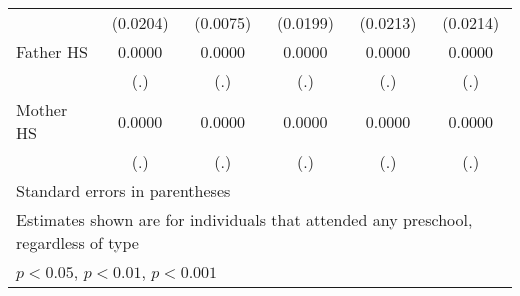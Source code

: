 \begin{table}[htbp]
\begin{tabular}{l*{5}{c}}
            &    (0.0204)         &    (0.0075)         &    (0.0199)         &    (0.0213)         &    (0.0214)         \\
\addlinespace
Father HS   &      0.0000         &      0.0000         &      0.0000         &      0.0000         &      0.0000         \\
            &         (.)         &         (.)         &         (.)         &         (.)         &         (.)         \\
\addlinespace
Mother HS   &      0.0000         &      0.0000         &      0.0000         &      0.0000         &      0.0000         \\
            &         (.)         &         (.)         &         (.)         &         (.)         &         (.)         \\
\bottomrule
\multicolumn{6}{l}{\footnotesize Standard errors in parentheses}\\
\multicolumn{6}{l}{\footnotesize Estimates shown are for individuals that attended any preschool, regardless of type}\\
\multicolumn{6}{l}{\footnotesize \sym{*} \(p<0.05\), \sym{**} \(p<0.01\), \sym{***} \(p<0.001\)}\\
\end{tabular}
\end{table}
